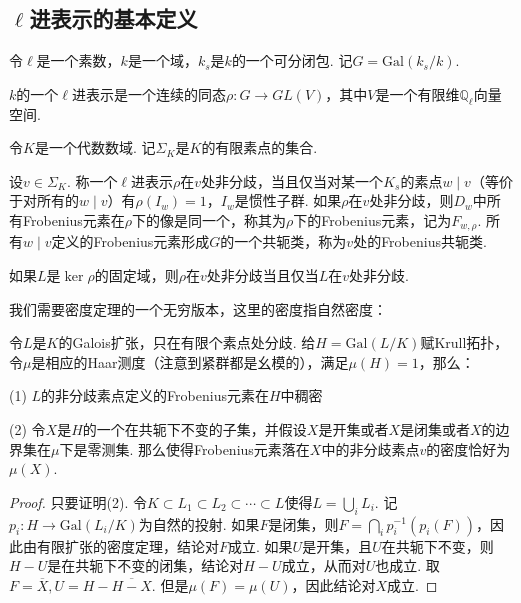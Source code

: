 \subsection{\texorpdfstring{$\ell$}{ELL}进表示的基本定义}

令$\ell$是一个素数，$k$是一个域，$k_s$是$k$的一个可分闭包. 记$G = \mathrm{Gal}(k_{s}/k)$.

\begin{cdef}
    $k$的一个$\ell$进表示是一个连续的同态$\rho: G\to GL(V)$，其中$V$是一个有限维$\mathbb{Q}_{\ell}$向量空间.
\end{cdef}

令$K$是一个代数数域. 记$\Sigma_K$是$K$的有限素点的集合.

\begin{cdef}
    设$v\in \Sigma_K$. 称一个$\ell$进表示$\rho$在$v$处非分歧，当且仅当对某一个$K_{s}$的素点$w\mid v$（等价于对所有的$w\mid v$）有$\rho(I_w) = 1$，$I_w$是惯性子群. 如果$\rho$在$v$处非分歧，则$D_w$中所有Frobenius元素在$\rho$下的像是同一个，称其为$\rho$下的Frobenius元素，记为$F_{w, \rho}$. 所有$w\mid v$定义的Frobenius元素形成$G$的一个共轭类，称为$v$处的Frobenius共轭类.
\end{cdef}

\begin{crem}
    如果$L$是$\ker \rho$的固定域，则$\rho$在$v$处非分歧当且仅当$L$在$v$处非分歧.
\end{crem}

我们需要\Chebotarev 密度定理的一个无穷版本，这里的密度指自然密度：

\begin{cthm}
    令$L$是$K$的Galois扩张，只在有限个素点处分歧. 给$H = \mathrm{Gal}(L/K)$赋Krull拓扑，令$\mu$是相应的Haar测度（注意到紧群都是幺模的），满足$\mu(H) = 1$，那么：

    (1) $L$的非分歧素点定义的Frobenius元素在$H$中稠密

    (2) 令$X$是$H$的一个在共轭下不变的子集，并假设$X$是开集或者$X$是闭集或者$X$的边界集在$\mu$下是零测集. 那么使得Frobenius元素落在$X$中的非分歧素点$v$的密度恰好为$\mu(X)$.
\end{cthm}

\begin{proof}
    只要证明(2). 令$K\subset L_1\subset L_2\subset \cdots \subset L$使得$L = \bigcup_i L_i$. 记$p_i: H\to \mathrm{Gal}(L_i/K)$为自然的投射. 如果$F$是闭集，则$F = \bigcap_i p_i^{-1}(p_i(F))$，因此由有限扩张的\Chebotarev 密度定理，结论对$F$成立. 如果$U$是开集，且$U$在共轭下不变，则$H-U$是在共轭下不变的闭集，结论对$H-U$成立，从而对$U$也成立. 取$F = \overline{X}, U = H - \overline{H-X}$. 但是$\mu(F) = \mu(U)$，因此结论对$X$成立.
\end{proof}

